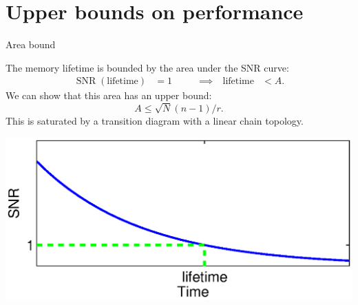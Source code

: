 \documentclass[final,hyperref={pdfpagelabels=false,bookmarks=false}]{beamer}
\DeclareMathOperator{\SNR}{SNR}
\begin{document}
\begin{frame}{}
\begin{columns}[t]
\begin{column}{0.37\linewidth}
\section{Upper bounds on performance}


\begin{block}{Area bound}
%
 \parbox[c]{26cm}{
  The memory lifetime is bounded by the area under the SNR curve:
  \begin{equation*}
  \begin{aligned}
    \SNR(\text{lifetime})&=1
    &\qquad
    \implies
    \quad
    \text{lifetime} &< A.
  \end{aligned}
  \end{equation*}
  We can show that this area has an upper bound:
  \begin{equation*}
    A \leq \sqrt{N}(n-1)/r.
  \end{equation*}
  This is saturated by a transition diagram with a linear chain topology.
 }
 \hfill
 \parbox[c]{16cm}{
  \begin{center}
    \includegraphics[width=15cm]{lifetime.eps}
  \end{center}
 }
%
\end{block}


\end{column}
\end{columns}
\end{frame}
\end{document}
